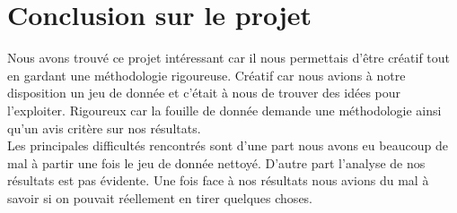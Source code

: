 \section{Conclusion sur le projet}
Nous avons trouvé ce projet intéressant car il nous permettais d'être créatif tout en gardant une méthodologie rigoureuse. Créatif car nous avions à notre disposition un jeu de donnée et c'était à nous de trouver des idées pour l'exploiter. Rigoureux car la fouille de donnée demande une méthodologie ainsi qu'un avis critère sur nos résultats.\\
Les principales difficultés rencontrés sont d'une part nous avons eu beaucoup de mal à partir une fois le jeu de donnée nettoyé. D'autre part l'analyse de nos résultats est pas évidente. Une fois face à nos résultats nous avions du mal à savoir si on pouvait réellement en tirer quelques choses.\\

